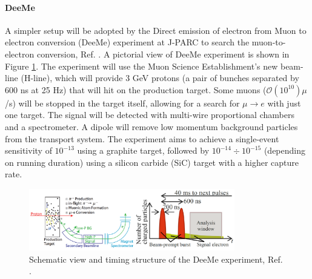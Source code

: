 \paragraph{DeeMe}
A simpler setup will be adopted by the Direct emission of electron from Muon to electron conversion (DeeMe) 
experiment at J-PARC to search the muon-to-electron conversion, Ref. \cite{deeme}.
A pictorial view of DeeMe experiment is shown in Figure \ref{fig:deeme}.
The experiment will use the Muon Science Establishment's new beam-line (H-line), 
which will provide 3 GeV protons (a pair of bunches separated by 600 ns at 25 Hz) 
that will hit on the production target. Some muons ($\mathcal{O}(10^{10})\mu$/s) will be stopped in the target itself, 
allowing for a search for $\mu \rightarrow e$ with just one target. The signal will be detected 
with multi-wire proportional chambers and a spectrometer. 
A dipole will remove low momentum background particles from the transport system. 
The experiment aims to achieve a single-event sensitivity of $10^{-13}$ using a graphite target, 
followed by $10^{-14} \div 10^{-15}$ (depending on running duration) using a silicon carbide (SiC) target with a higher capture rate. 
\begin{figure}[!h]
    \centering
    \includegraphics[width =0.8\textwidth]{figures/png/Screenshot_20240322_101840.png}
    \caption{Schematic view and timing structure of the DeeMe experiment, Ref. \cite{deeme}.}
    \label{fig:deeme}
    \end{figure}
